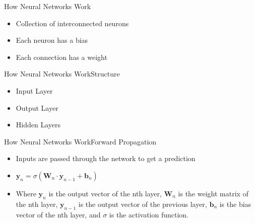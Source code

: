 \documentclass{beamer}
\begin{document}
\begin{frame}{How Neural Networks Work}
    \begin{itemize}
        \item Collection of interconnected neurons
        \item Each neuron has a bias
        \item Each connection has a weight
    \end{itemize}
\end{frame}

\begin{frame}{How Neural Networks Work}{Structure}
    \begin{itemize}
        \item Input Layer
        \item Output Layer
        \item Hidden Layers
    \end{itemize}
\end{frame}

\begin{frame}{How Neural Networks Work}{Forward Propagation}
    \begin{itemize}
        \item Inputs are passed through the network to get a prediction
        \item $\textbf{y}_n=\sigma{(\textbf{W}_n\cdot\textbf{y}_{n-1} + \textbf{b}_n)}$
        \item Where $\textbf{y}_n$ is the output vector of the nth layer, $\textbf{W}_n$ is the weight matrix of the nth layer, $\textbf{y}_{n-1}$ is the output vector of the previous layer, $\textbf{b}_n$ is the bias vector of the nth layer, and $\sigma$ is the activation function.
    \end{itemize}
\end{frame}
\end{document}
